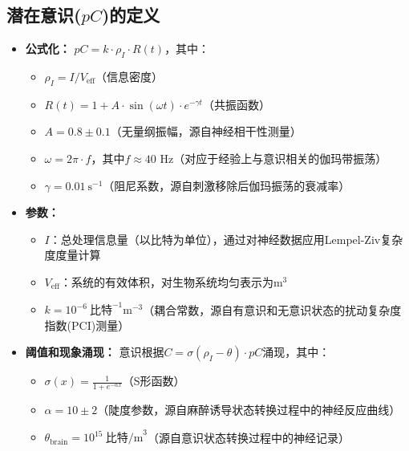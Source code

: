 \documentclass[12pt]{article}
\begin{document}
\subsection{潜在意识($pC$)的定义}
\begin{itemize}
    \item \textbf{公式化：} $pC = k \cdot \rho_I \cdot R(t)$，其中：
    \begin{itemize}
        \item $\rho_I = I / V_{\text{eff}}$（信息密度）
        \item $R(t) = 1 + A \cdot \sin(\omega t) \cdot e^{-\gamma t}$（共振函数）
        \item $A = 0.8 \pm 0.1$（无量纲振幅，源自神经相干性测量\cite{melloni2007}）
        \item $\omega = 2\pi \cdot f$，其中$f \approx 40$ Hz（对应于经验上与意识相关的伽玛带振荡\cite{crick1990,dehaene2011}）
        \item $\gamma = 0.01~\text{s}^{-1}$（阻尼系数，源自刺激移除后伽玛振荡的衰减率\cite{buzsaki2004,fries2015}）
    \end{itemize}
    
    \item \textbf{参数：} 
    \begin{itemize}[label=--]
        \item $I$：总处理信息量（以比特为单位），通过对神经数据应用Lempel-Ziv复杂度度量计算\cite{schartner2015}
        \item $V_{\text{eff}}$：系统的有效体积，对生物系统均匀表示为$\text{m}^3$
        \item $k = 10^{-6}~\text{比特}^{-1}\text{m}^{-3}$（耦合常数，源自有意识和无意识状态的扰动复杂度指数(PCI)测量\cite{casali2013,casarotto2016}）
    \end{itemize}
    
    \item \textbf{阈值和现象涌现：} 意识根据$C = \sigma(\rho_I - \theta) \cdot pC$涌现，其中：
    \begin{itemize}[label=--]
        \item $\sigma(x) = \frac{1}{1 + e^{-\alpha x}}$（S形函数）
        \item $\alpha = 10 \pm 2$（陡度参数，源自麻醉诱导状态转换过程中的神经反应曲线\cite{chennu2014,storm2017}）
        \item $\theta_{\text{brain}} = 10^{15}~\text{比特/m}^3$（源自意识状态转换过程中的神经记录\cite{tononi2016,mashour2020}）
    \end{itemize}
\end{itemize}
\end{document}
